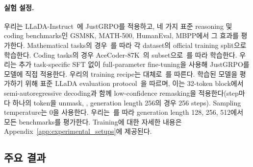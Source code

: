 \paragraph{실험 설정.}
우리는 LLaDA-Instruct~\cite{nie2025large}에 JustGRPO를 적용하고, 네 가지 표준 reasoning 및 coding benchmarks인 GSM8K, MATH-500, HumanEval, MBPP에서 그 효과를 평가한다.
Mathematical tasks의 경우~\cite{zhao2025d1,ou2025principled}를 따라 각 dataset의 official training split으로 학습한다. Coding tasks의 경우 AceCoder-87K~\cite{zeng2025acecoder}의 subset으로~\cite{gong2025diffucoder,ou2025principled}를 따라 학습한다.
우리는 추가 task-specific SFT 없이 full-parameter fine-tuning을 사용해 JustGRPO를 모델에 직접 적용한다.
우리의 training recipe는 대체로~\cite{huang2025reinforcing}를 따른다.
학습된 모델을 평가하기 위해 표준 LLaDA evaluation protocol~\cite{nie2025large}을 따르며, 이는 32-token block에서 semi-autoregressive decoding과 함께 low-confidence remasking을 적용한다(step마다 하나의 token을 unmask, \ie, generation length 256의 경우 256 steps). Sampling temperature는 0을 사용한다.
우리는~\cite{zhao2025d1,ou2025principled}를 따라 generation length 128, 256, 512에서 모든 benchmarks를 평가한다.
Training에 대한 자세한 내용은 Appendix~\ref{app:experimental_setups}에 제공된다.

\subsection{주요 결과}
\label{subsec:main_results}

